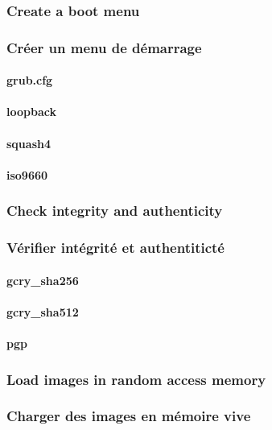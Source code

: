 \ml
{\subsubsection{Create a boot menu}}
{\subsubsection{Créer un menu de démarrage}}

\paragraph{grub.cfg}

\paragraph{loopback}

\paragraph{squash4}

\paragraph{iso9660}

\ml
{\subsubsection{Check integrity and authenticity}}
{\subsubsection{Vérifier intégrité et authentiticté}}

\paragraph{gcry\_sha256}

\paragraph{gcry\_sha512}

\paragraph{pgp}

\ml
{\subsubsection{Load images in random access memory}}
{\subsubsection{Charger des images en mémoire vive}}


